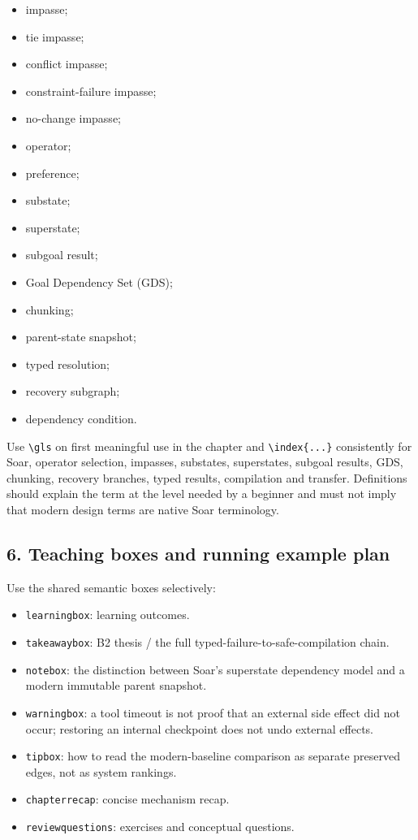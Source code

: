 \begin{itemize}
\tightlist
\item
  impasse;
\item
  tie impasse;
\item
  conflict impasse;
\item
  constraint-failure impasse;
\item
  no-change impasse;
\item
  operator;
\item
  preference;
\item
  substate;
\item
  superstate;
\item
  subgoal result;
\item
  Goal Dependency Set (GDS);
\item
  chunking;
\item
  parent-state snapshot;
\item
  typed resolution;
\item
  recovery subgraph;
\item
  dependency condition.
\end{itemize}

Use \texttt{\textbackslash{}gls} on first meaningful use in the chapter and \texttt{\textbackslash{}index\{...\}} consistently for Soar, operator selection, impasses, substates, superstates, subgoal results, GDS, chunking, recovery branches, typed results, compilation and transfer. Definitions should explain the term at the level needed by a beginner and must not imply that modern design terms are native Soar terminology.

\subsection{6. Teaching boxes and running example plan}\label{teaching-boxes-and-running-example-plan}

Use the shared semantic boxes selectively:

\begin{itemize}
\tightlist
\item
  \texttt{learningbox}: learning outcomes.
\item
  \texttt{takeawaybox}: B2 thesis / the full typed-failure-to-safe-compilation chain.
\item
  \texttt{notebox}: the distinction between Soar's superstate dependency model and a modern immutable parent snapshot.
\item
  \texttt{warningbox}: a tool timeout is not proof that an external side effect did not occur; restoring an internal checkpoint does not undo external effects.
\item
  \texttt{tipbox}: how to read the modern-baseline comparison as separate preserved edges, not as system rankings.
\item
  \texttt{chapterrecap}: concise mechanism recap.
\item
  \texttt{reviewquestions}: exercises and conceptual questions.
\end{itemize}


